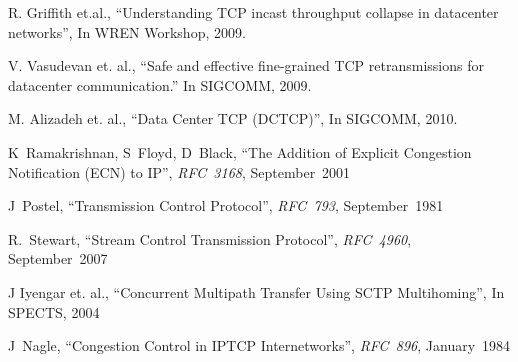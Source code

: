 \documentclass[12pt]{article}
\begin{document}
\begin{thebibliography}{8}

R. Griffith et.al.,
  ``Understanding TCP incast throughput collapse in datacenter networks'', 
  In WREN Workshop, 2009.
  
  V. Vasudevan et. al.,
  ``Safe and effective fine-grained TCP retransmissions for datacenter communication.''
 In SIGCOMM, 2009.
 
 M. Alizadeh et. al.,
 ``Data Center TCP (DCTCP)'',
 In SIGCOMM, 2010.
 
  K~Ramakrishnan, S~Floyd, D~Black,
  ``The Addition of Explicit Congestion Notification (ECN) to IP'',
  \textit{RFC~3168},
  September~2001
 
  J~Postel,
  ``Transmission Control Protocol'',
  \textit{RFC~793},
  September~1981
  
 R.~Stewart,
  ``Stream Control Transmission Protocol'',
  \textit{RFC~4960},
 September~2007
 
 J Iyengar et. al.,
 ``Concurrent Multipath Transfer Using SCTP Multihoming'',
 In SPECTS, 2004
 
   J~Nagle,
 ``Congestion Control in IP\/TCP Internetworks'',
  \textit{RFC~896},
 January~1984
 
\end{thebibliography}




\end{document}
